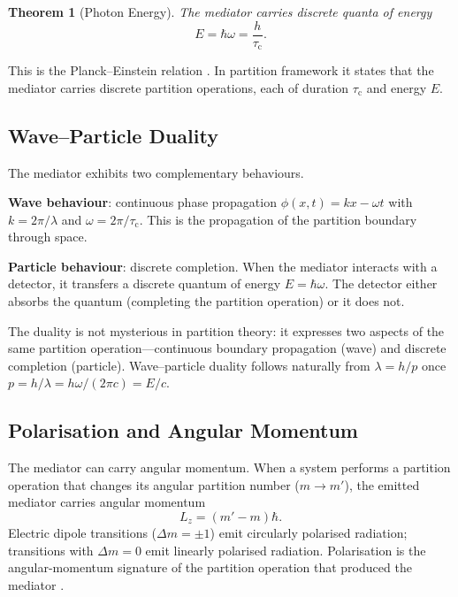\documentclass[twocolumn,10pt,a4paper]{article}
\newtheorem{theorem}{Theorem}[section]
\theoremstyle{definition}
\theoremstyle{remark}
\newcommand{\tauC}{\tau_{\mathrm{c}}}
\begin{document}
\begin{theorem}[Photon Energy]
\label{thm:photon}
The mediator carries discrete quanta of energy
\begin{equation}
E = \hbar\omega = \frac{h}{\tauC}.
\label{eq:photon_energy}
\end{equation}
\end{theorem}

This is the Planck--Einstein relation \citep{planck1901,einstein1905photo}. In partition framework it states that the mediator carries discrete partition operations, each of duration $\tauC$ and energy $E$.

\subsection{Wave--Particle Duality}

The mediator exhibits two complementary behaviours.

\textbf{Wave behaviour}: continuous phase propagation $\phi(x,t) = kx - \omega t$ with $k = 2\pi/\lambda$ and $\omega = 2\pi/\tauC$. This is the propagation of the partition boundary through space.

\textbf{Particle behaviour}: discrete completion. When the mediator interacts with a detector, it transfers a discrete quantum of energy $E = \hbar\omega$. The detector either absorbs the quantum (completing the partition operation) or it does not.

The duality is not mysterious in partition theory: it expresses two aspects of the same partition operation---continuous boundary propagation (wave) and discrete completion (particle). Wave--particle duality follows naturally from $\lambda = h/p$ \citep{debroglie1924} once $p = h/\lambda = h \omega/(2\pi c) = E/c$.

\subsection{Polarisation and Angular Momentum}

The mediator can carry angular momentum. When a system performs a partition operation that changes its angular partition number ($m \to m'$), the emitted mediator carries angular momentum
\begin{equation}
L_z = (m' - m)\hbar.
\label{eq:angular_momentum_photon}
\end{equation}
Electric dipole transitions ($\Delta m = \pm 1$) emit circularly polarised radiation; transitions with $\Delta m = 0$ emit linearly polarised radiation. Polarisation is the angular-momentum signature of the partition operation that produced the mediator \citep{hamermesh1962}.
\end{document}
